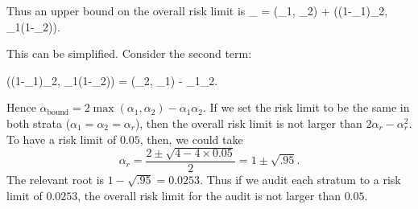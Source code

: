 Thus an upper bound on the overall risk limit is 
\beq
    \alpha_{} = \max (\alpha_1, \alpha_2) + \max((1-\alpha_1)\alpha_2, \alpha_1(1-\alpha_2)).
\eeq

This can be simplified. 
Consider the second term:
  
\beq
    \max((1-\alpha_1)\alpha_2, \alpha_1(1-\alpha_2)) = \max(\alpha_2, \alpha_1) - \alpha_1\alpha_2.
\eeq

Hence $\alpha_{\mathrm{bound}} = 2 \max(\alpha_1, \alpha_2) - \alpha_1\alpha_2$.
If we set the risk limit to be the same in both strata ($\alpha_1 = \alpha_2 = \alpha_r$), then the
overall risk limit is not larger than $2\alpha_r - \alpha_r^2$.
To have a risk limit of $0.05$, then, we could take 
$$
    \alpha_r =  \frac{2 \pm \sqrt{4-4\times 0.05}}{2} = 1 \pm \sqrt{.95}.
$$
The relevant root is $1-\sqrt{.95} = 0.0253$.
Thus if we audit each stratum to a risk limit of $0.0253$, the overall risk limit for the audit is not
larger than $0.05$.

